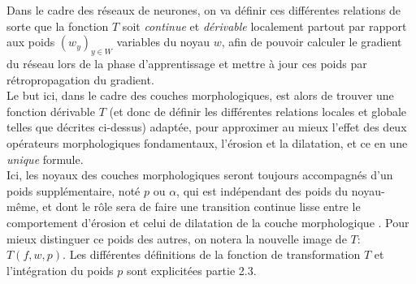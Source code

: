 \vspace{-1.6mm}
\noindent Dans le cadre des réseaux de neurones, on va définir ces différentes relations de sorte que la fonction $T$ soit \textit{continue} et \textit{dérivable} localement partout par rapport aux poids $(w_y)_{y \in W}$ variables du noyau $w$, afin de pouvoir calculer le gradient du réseau lors de la phase d'apprentissage et mettre à jour ces poids par rétropropagation du gradient. \\

Le but ici, dans le cadre des couches morphologiques, est alors de trouver une fonction dérivable $T$ (et donc de définir les différentes relations locales et globale telles que décrites ci-dessus) adaptée, pour approximer au mieux l'effet des deux opérateurs morphologiques fondamentaux, l'érosion et la dilatation, et ce en une \textit{unique} formule. \\

\vspace{-1.6mm}
\noindent Ici, les noyaux des couches morphologiques seront toujours accompagnés d'un poids supplémentaire, noté $p$ ou $\alpha$, qui est indépendant des poids du noyau-même, et dont le rôle sera de faire une transition continue lisse entre le comportement d'érosion et celui de dilatation de la couche morphologique \cite{Hermary_2022}. Pour mieux distinguer ce poids des autres, on notera la nouvelle image de $T$: $T(f,w,p)$. Les différentes définitions de la fonction de transformation $T$ et l'intégration du poids $p$ sont explicitées partie 2.3.
